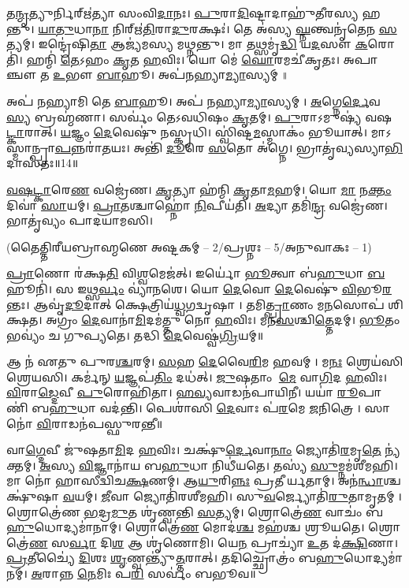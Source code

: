 𑌤\ul{𑌨𑍍𑌮𑍃}𑌤𑍍𑌯𑍁𑌰𑍍𑌨𑌿𑌰𑍍\mbox{}𑌋॑𑌤𑍍𑌯𑌾 𑌸𑌂𑌵𑌿\ul{𑌦𑌾}𑌨𑌃।
\ul{𑌪𑍁}𑌰𑌾\ul{𑌦𑌿}𑌷𑍍𑌟𑌾𑌦𑌾𑌹𑍁॑𑌤𑍀𑌰𑌸𑍍𑌯 𑌹𑌨𑍍𑌤𑍁।
\ul{𑌯𑌾}\ul{𑌤𑍁}𑌧𑌾\ul{𑌨𑌾} 𑌨𑌿𑌰𑍍\mbox{}𑌋॑\ul{𑌤𑌿}𑌰𑌾\ul{𑌦𑍁}𑌰𑌕𑍍𑌷𑌃॑।
𑌤𑍇 𑌅॑𑌸𑍍𑌯 \ul{𑌘𑍍𑌨}𑌨𑍍𑌤𑍍𑌵𑌨𑍃॑𑌤𑍇𑌨 \ul{𑌸}𑌤𑍍𑌯𑌮𑍍।
𑌇𑌨𑍍𑌦𑍍𑌰𑍇॑𑌷𑌿\ul{𑌤𑌾} 𑌆𑌜𑍍𑌯॑𑌮𑌸𑍍𑌯 𑌮𑌥𑍍𑌨𑌨𑍍𑌤𑍁।
𑌮𑌾 𑌤𑌥𑍍𑌸𑌮𑍃॑\ul{𑌦𑍍𑌧𑌿} 𑌯\ul{𑌦}𑌸𑍗 \ul{𑌕}𑌰𑍋𑌤𑌿॑।
𑌹𑌨𑍍𑌮𑌿॑ \ul{𑌤𑍇}𑌽𑌹𑌂 \ul{𑌕𑍃}𑌤 \ul{𑌹}𑌵𑌿𑌃।
𑌯𑍋 𑌮𑍇॑ \ul{𑌘𑍋}𑌰𑌮𑌚𑍀॑𑌕𑍃𑌤𑌃।
𑌅𑌪𑌾𑌞𑍍𑌚𑍗 𑌤 \ul{𑌉}𑌭𑍗 \ul{𑌬𑌾}𑌹𑍂।
𑌅𑌪॑𑌨𑌹𑍍𑌯𑌾\ul{𑌮𑍍𑌯𑌾}𑌸𑍍𑌯𑌮𑍍॥

𑌅𑌪॑ 𑌨𑌹𑍍𑌯𑌾𑌮𑌿 𑌤𑍇 \ul{𑌬𑌾}𑌹𑍂।
𑌅𑌪॑ 𑌨𑌹𑍍𑌯𑌾\ul{𑌮𑍍𑌯𑌾}𑌸𑍍𑌯𑌮𑍍।
\ul{𑌅}𑌗𑍍𑌨𑍇\ul{𑌰𑍍𑌦𑍇}𑌵\ul{𑌸𑍍𑌯} 𑌬𑍍𑌰𑌹𑍍𑌮॑𑌣𑌾।
𑌸𑌰𑍍𑌵𑌂॑ 𑌤𑍇𑌽𑌵𑌧𑌿𑌷𑌂 \ul{𑌕𑍃}𑌤𑌮𑍍।
\ul{𑌪𑍁}𑌰𑌾𑌽𑌮𑍁𑌷𑍍𑌯॑ 𑌵𑌷\ul{𑌟𑍍𑌕𑌾}𑌰𑌾𑌤𑍍।
\ul{𑌯}𑌜𑍍𑌞𑌂 \ul{𑌦𑍇}𑌵𑍇𑌷𑍁॑ 𑌨𑌸𑍍𑌕𑍃𑌧𑌿।
𑌸𑍍𑌵𑌿॑𑌷𑍍𑌟\ul{𑌮}𑌸𑍍𑌮𑌾𑌕𑌂॑ 𑌭𑍂𑌯𑌾𑌤𑍍।
𑌮𑌾𑌽𑌸𑍍𑌮𑌾𑌨𑍍𑌪𑍍𑌰𑌾\ul{𑌪}𑌨𑍍𑌨\-𑌰𑌾॑𑌤𑌯𑌃।
𑌅𑌨𑍍𑌤𑌿॑ \ul{𑌦𑍂}𑌰𑍇 \ul{𑌸}𑌤𑍋 𑌅॑𑌗𑍍𑌨𑍇।
𑌭𑍍𑌰𑌾𑌤𑍃॑𑌵𑍍𑌯𑌸𑍍𑌯𑌾\ul{𑌭𑌿}𑌦𑌾𑌸॑𑌤𑌃॥14॥

\ul{𑌵}\ul{𑌷}\ul{𑌟𑍍𑌕𑌾}𑌰𑍇\ul{𑌣} 𑌵𑌜𑍍𑌰𑍇॑𑌣।
\ul{𑌕𑍃}𑌤𑍍𑌯𑌾 𑌹॑𑌨𑍍𑌮𑌿 \ul{𑌕𑍃}𑌤𑌾\ul{𑌮}𑌹𑌮𑍍।
𑌯𑍋 \ul{𑌮𑌾} 𑌨\ul{𑌕𑍍𑌤𑌂} 𑌦𑌿𑌵𑌾॑ \ul{𑌸𑌾}𑌯𑌮𑍍।
\ul{𑌪𑍍𑌰𑌾}𑌤𑌶𑍍𑌚𑌾𑌹𑍍𑌨𑍋॑ \ul{𑌨𑌿}𑌪𑍀𑌯॑𑌤𑌿।
\ul{𑌅}𑌦𑍍𑌯𑌾 𑌤𑌮𑌿॑\ul{𑌨𑍍𑌦𑍍𑌰} 𑌵𑌜𑍍𑌰𑍇॑𑌣।
𑌭𑌾𑌤𑍃॑𑌵𑍍𑌯𑌂 𑌪𑌾𑌦𑌯𑌾𑌮𑌸𑌿।

\centerline{\normalsize (𑌤𑍈𑌤𑍍𑌤𑌿𑌰𑍀𑌯𑌬𑍍𑌰𑌾𑌹𑍍𑌮𑌣𑍇 𑌅𑌷𑍍𑌟𑌕𑌮𑍍 – 2/𑌪𑍍𑌰𑌶𑍍𑌨𑌃 – 5/𑌅𑌨𑍁𑌵𑌾𑌕𑌃 – 1)}

\ul{𑌪𑍍𑌰𑌾}𑌣𑍋 𑌰॑𑌕𑍍𑌷\ul{𑌤𑌿} 𑌵𑌿\ul{𑌶𑍍𑌵}𑌮𑍇𑌜॑𑌤𑍍।
𑌇𑌰𑍍𑌯𑍋॑ \ul{𑌭𑍂}𑌤𑍍𑌵𑌾 𑌬॑\ul{𑌹𑍁}𑌧𑌾 \ul{𑌬}𑌹𑍂𑌨𑌿॑।
𑌸 𑌇𑌥𑍍𑌸\ul{𑌰𑍍𑌵𑌂} 𑌵𑍍𑌯𑌾॑𑌨𑌶𑍇।
𑌯𑍋 \ul{𑌦𑍇}𑌵𑍋 \ul{𑌦𑍇}𑌵𑍇𑌷𑍁॑ \ul{𑌵𑌿}𑌭𑍂\ul{𑌰}𑌨𑍍𑌤𑌃।
𑌆𑌵𑍃॑\ul{𑌦𑍂}𑌦𑌾𑌤𑍍 𑌕𑍍𑌷𑍇𑌤𑍍𑌰𑌿𑌯॑\ul{𑌧𑍍𑌵}𑌗𑌦𑍍𑌵𑍃𑌷𑌾।
𑌤𑌮𑌿\ul{𑌤𑍍𑌪𑍍𑌰𑌾}𑌣𑌂 𑌮\ul{𑌨}𑌸𑍋𑌪॑ 𑌶𑌿𑌕𑍍𑌷𑌤।
𑌅𑌗𑍍𑌰𑌂॑ \ul{𑌦𑍇}𑌵𑌾𑌨𑌾॑\ul{𑌮𑌿}𑌦𑌮॑𑌤𑍍𑌤𑍁 𑌨𑍋 \ul{𑌹}𑌵𑌿𑌃।
𑌮𑌨॑\ul{𑌸}𑌶𑍍𑌚𑌿\ul{𑌤𑍍𑌤𑍇}𑌦𑌮𑍍।
\ul{𑌭𑍂}𑌤𑌂 𑌭𑌵𑍍𑌯𑌂॑ 𑌚 𑌗𑍁𑌪𑍍𑌯𑌤𑍇।
𑌤𑌦𑍍𑌧𑌿 \ul{𑌦𑍇}𑌵𑍇𑌷𑍍𑌵॑\ul{𑌗𑍍𑌰𑌿}𑌯𑌮𑍍॥

𑌆 𑌨॑ 𑌏𑌤𑍁 𑌪𑍁𑌰\ul{𑌶𑍍𑌚}𑌰𑌮𑍍।
\ul{𑌸}𑌹 \ul{𑌦𑍇}𑌵𑍈\ul{𑌰𑌿}𑌮 𑌹𑌵𑌮𑍍।
𑌮\ul{𑌨𑌃} 𑌶𑍍𑌰𑍇𑌯॑𑌸𑌿𑌶𑍍𑌰𑍇𑌯𑌸𑌿।
𑌕𑌰𑍍𑌮॑𑌨𑍍 \ul{𑌯}𑌜𑍍𑌞𑌪॑\ul{𑌤𑌿𑌂} 𑌦𑌧॑𑌤𑍍।
\ul{𑌜𑍁}𑌷𑌤𑌾𑌂 \ul{𑌮𑍇} 𑌵𑌾\ul{𑌗𑌿}𑌦 \ul{𑌹}𑌵𑌿𑌃।
\ul{𑌵𑌿}𑌰𑌾\ul{𑌡𑍍𑌦𑍇}𑌵𑍀 \ul{𑌪𑍁}𑌰𑍋𑌹𑌿॑𑌤𑌾।
\ul{𑌹}\ul{𑌵𑍍𑌯}𑌵𑌾𑌡𑌨॑𑌪𑌾𑌯𑌿𑌨𑍀।
𑌯𑌯𑌾॑ \ul{𑌰𑍂}𑌪𑌾𑌣𑌿॑ 𑌬\ul{𑌹𑍁}𑌧𑌾 𑌵𑌦॑𑌨𑍍𑌤𑌿।
𑌪𑍇𑌶𑌾॑𑌸𑌿 \ul{𑌦𑍇}𑌵𑌾𑌃 𑌪॑\ul{𑌰}𑌮𑍇 \ul{𑌜}𑌨𑌿𑌤𑍍𑌰𑍇।
𑌸𑌾 𑌨𑍋॑ \ul{𑌵𑌿}𑌰𑌾𑌡𑌨॑𑌪𑌸𑍍𑌫𑍁𑌰𑌨𑍍𑌤𑍀॥

𑌵𑌾\ul{𑌗𑍍𑌦𑍇}𑌵𑍀 𑌜𑍁॑𑌷𑌤𑌾\ul{𑌮𑌿}𑌦 \ul{𑌹}𑌵𑌿𑌃।
𑌚𑌕𑍍𑌷𑍁॑\ul{𑌰𑍍𑌦𑍇}𑌵𑌾\ul{𑌨𑌾𑌂} 𑌜𑍍𑌯𑍋𑌤𑌿॑\ul{𑌰}𑌮𑍃\ul{𑌤𑍇} 𑌨𑍍𑌯॑𑌕𑍍𑌤𑌮𑍍।
\ul{𑌅}𑌸𑍍𑌯 \ul{𑌵𑌿}𑌜𑍍𑌞𑌾𑌨𑌾॑𑌯 𑌬\ul{𑌹𑍁}𑌧𑌾 𑌨𑌿𑌧𑍀॑𑌯𑌤𑍇।
𑌤𑌸𑍍𑌯॑ \ul{𑌸𑍁}𑌮𑍍𑌨𑌮॑𑌶𑍀𑌮𑌹𑌿।
𑌮𑌾 𑌨𑍋॑ 𑌹𑌾𑌸𑍀𑌦𑍍𑌵𑌿𑌚\ul{𑌕𑍍𑌷}𑌣𑌮𑍍।
𑌆\ul{𑌯𑍁}𑌰𑌿\ul{𑌨𑍍𑌨𑌃} 𑌪𑍍𑌰𑌤𑍀𑌰𑍍𑌯𑌤𑌾𑌮𑍍।
𑌅𑌨॑\ul{𑌨𑍍𑌧𑌾}𑌶𑍍𑌚𑌕𑍍𑌷𑍁॑𑌷𑌾 \ul{𑌵}𑌯𑌮𑍍।
\ul{𑌜𑍀}𑌵𑌾 𑌜𑍍𑌯𑍋𑌤𑌿॑𑌰𑌶𑍀𑌮𑌹𑌿।
𑌸𑍁\ul{𑌵}𑌰𑍍𑌜𑍍𑌯𑍋𑌤𑌿॑\ul{𑌰𑍁}𑌤𑌾𑌮𑍃𑌤𑌮𑍍।
𑌶𑍍𑌰𑍋𑌤𑍍𑌰𑍇॑𑌣 \ul{𑌭}𑌦𑍍𑌰\ul{𑌮𑍁}𑌤 𑌶𑍃॑𑌣𑍍𑌵𑌨𑍍𑌤𑌿 \ul{𑌸}𑌤𑍍𑌯𑌮𑍍।
𑌶𑍍𑌰𑍋𑌤𑍍𑌰𑍇॑\ul{𑌣} 𑌵𑌾𑌚𑌂॑ 𑌬\ul{𑌹𑍁}𑌧𑍋𑌦𑍍𑌯𑌮𑌾॑𑌨𑌾𑌮𑍍।
𑌶𑍍𑌰𑍋𑌤𑍍𑌰𑍇॑\ul{𑌣} 𑌮𑍋𑌦॑\ul{𑌶𑍍𑌚} 𑌮𑌹॑𑌶𑍍𑌚 𑌶𑍍𑌰𑍂𑌯𑌤𑍇।
𑌶𑍍𑌰𑍋𑌤𑍍𑌰𑍇॑\ul{𑌣} 𑌸\ul{𑌰𑍍𑌵𑌾} 𑌦𑌿\ul{𑌶} 𑌆 𑌶𑍃॑𑌣𑍋𑌮𑌿।
𑌯𑍇\ul{𑌨} 𑌪𑍍𑌰𑌾𑌚𑍍𑌯𑌾॑ \ul{𑌉}𑌤 𑌦॑\ul{𑌕𑍍𑌷𑌿}𑌣𑌾।
\ul{𑌪𑍍𑌰}𑌤𑍀𑌚𑍍𑌯𑍈॑ \ul{𑌦𑌿}𑌶𑌃 \ul{𑌶𑍃}𑌣𑍍𑌵𑌨𑍍𑌤𑍍𑌯𑍁॑\ul{𑌤𑍍𑌤}𑌰𑌾𑌤𑍍।
𑌤𑌦𑌿𑌚𑍍𑌛𑍍𑌰𑍋𑌤𑍍𑌰𑌂॑ 𑌬\ul{𑌹𑍁}𑌧𑍋𑌦𑍍𑌯𑌮𑌾॑𑌨𑌮𑍍।
\ul{𑌅}𑌰𑌾𑌨𑍍𑌨 \ul{𑌨𑍇}𑌮𑌿𑌃 𑌪\ul{𑌰𑌿} 𑌸𑌰𑍍𑌵𑌂॑ 𑌬𑌭𑍂𑌵॥

